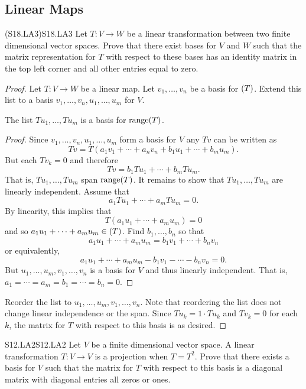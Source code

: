 \documentclass[../AlgebraQualSolutions.tex]{subfiles}
\begin{document}
\subsection{Linear Maps}

	\begin{prob}{(S18.LA3)}{S18.LA3}
		Let $T: V \to W$ be a linear transformation between two finite dimensional vector spaces. Prove that there exist bases for $V$ and $W$ such that the matrix representation for $T$ with respect to these bases has an identity matrix in the top left corner and all other entries equal to zero.
	\end{prob}

	\begin{proof}
		Let $T: V \to W$ be a linear map. Let $v_1,\ldots, v_n$ be a basis for $\null(T)$. Extend this list to a basis $v_1,\ldots, v_n,u_1,\ldots,u_m$ for $V$.

		\begin{claim}
			The list $Tu_1,\ldots, Tu_m$ is a basis for $\mathrm{range}(T)$.

			\begin{proof}
				Since $v_1,\ldots, v_n,u_1,\ldots, u_m$ form a basis for $V$ any $Tv$ can be written as 
					\[Tv = T(a_1v_1 + \cdots + a_nv_n + b_1u_1 + \cdots + b_mu_m).\]
				But each $Tv_k = 0$ and therefore
					\[Tv = b_1Tu_1 + \cdots + b_mTu_m.\]
				That is, $Tu_1,\ldots, Tu_m$ span $\mathrm{range}(T)$. It remains to show that $Tu_1,\ldots, Tu_m$ are linearly independent. Assume that 
					\[a_1Tu_1 + \cdots + a_mTu_m = 0.\]
				By linearity, this implies that
					\[T(a_1u_1 + \cdots + a_mu_m) = 0\]
				and so $a_1u_1 + \cdots + a_mu_m \in \null(T)$. Find $b_1,\ldots, b_n$ so that
					\[a_1u_1 + \cdots + a_mu_m = b_1v_1 + \cdots + b_nv_n\]
				or equivalently,
				\[a_1u_1 + \cdots + a_mu_m - b_1v_1 - \cdots - b_nv_n = 0.\]
				But $u_1,\ldots,u_m,v_1,\ldots,v_n$ is a basis for $V$ and thus linearly independent. That is, $a_1 = \cdots = a_m = b_1 = \cdots = b_n = 0$.
			\end{proof}
		\end{claim}

		Reorder the list to $u_1,\ldots,u_m,v_1,\ldots, v_n$. Note that reordering the list does not change linear independence or the span. Since $Tu_k = 1\cdot Tu_k$ and $Tv_k = 0$ for each $k$, the matrix for $T$ with respect to this basis is as desired.
	\end{proof}

	\begin{prob}{S12.LA2}{S12.LA2}
		Let $V$ be a finite dimensional vector space. A linear transformation $T: V \to V$ is a projection when $T = T^2$. Prove that there exists a basis for $V$ such that the matrix for $T$ with respect to this basis is a diagonal matrix with diagonal entries all zeros or ones.
	\end{prob}
\end{document}
